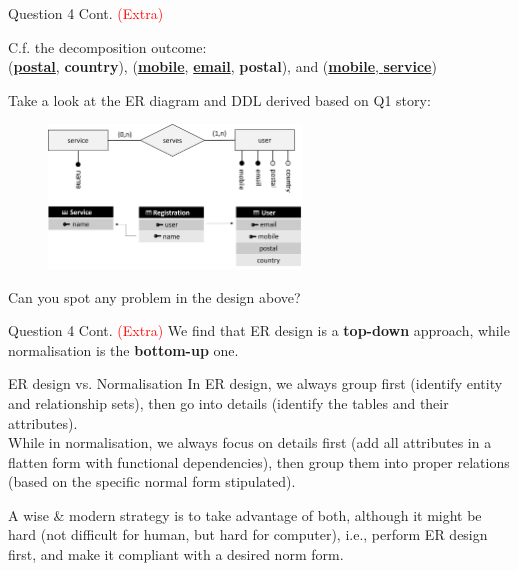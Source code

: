 \begin{frame}[fragile]{Question 4 Cont. \textcolor{red}{(Extra)}}

C.f. the decomposition outcome: \\
(\textbf{\underline{postal}}, \textbf{country}),
(\textbf{\underline{mobile}}, \textbf{\underline{email}}, \textbf{postal}),
and (\underline{\textbf{mobile}, \textbf{service}})\\\vspace{5pt}

Take a look at the ER diagram and DDL derived based on Q1 story:\\\vspace{5pt}
\begin{figure}
	\includegraphics[width=0.6\textwidth, trim=0 0 0 0, clip]{t5/images/er-diagram.png}
\end{figure}

Can you spot any problem in the design above?\\\vspace{5pt}
\end{frame}

\begin{frame}[fragile]{Question 4 Cont. \textcolor{red}{(Extra)}}
We find that ER design is a \textbf{top-down} approach, while normalisation is the \textbf{bottom-up} one.\\\vspace{5pt}

\begin{block}{ER design vs. Normalisation}
	In ER design, we always group first (identify entity and relationship sets), then go into details (identify the tables and their attributes).\\
	While in normalisation, we always focus on details first (add all attributes in a flatten form with functional dependencies), then group them into proper relations (based on the specific normal form stipulated).
\end{block}

A wise \& modern strategy is to take advantage of both, although it might be hard (not difficult for human, but hard for computer), i.e.,
perform ER design first, and make it compliant with a desired norm form.
\end{frame}

